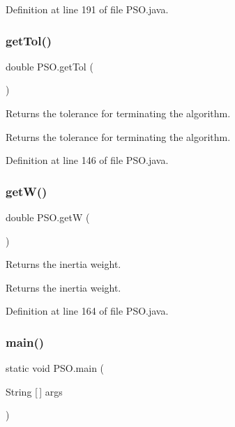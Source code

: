 Definition at line 191 of file P\+S\+O.\+java.

\mbox{\label{class_p_s_o_a57be39727a5a7e22182c82d4274ba3ae}} 
\subsubsection{\texorpdfstring{get\+Tol()}{getTol()}}
{\footnotesize\ttfamily double P\+S\+O.\+get\+Tol (\begin{DoxyParamCaption}{ }\end{DoxyParamCaption})}

Returns the tolerance for terminating the algorithm. \begin{DoxyReturn}{Returns}
the tolerance for terminating the algorithm. 
\end{DoxyReturn}


Definition at line 146 of file P\+S\+O.\+java.

\mbox{\label{class_p_s_o_a50f5f8be53be944150317d590c411144}} 
\subsubsection{\texorpdfstring{get\+W()}{getW()}}
{\footnotesize\ttfamily double P\+S\+O.\+getW (\begin{DoxyParamCaption}{ }\end{DoxyParamCaption})}

Returns the inertia weight. \begin{DoxyReturn}{Returns}
the inertia weight. 
\end{DoxyReturn}


Definition at line 164 of file P\+S\+O.\+java.

\mbox{\label{class_p_s_o_a966198c3d9ecb21acf593a5e922ba843}} 
\subsubsection{\texorpdfstring{main()}{main()}}
{\footnotesize\ttfamily static void P\+S\+O.\+main (\begin{DoxyParamCaption}\item[{String \mbox{[}$\,$\mbox{]}}]{args }\end{DoxyParamCaption})\hspace{0.3cm}{\ttfamily [static]}}

